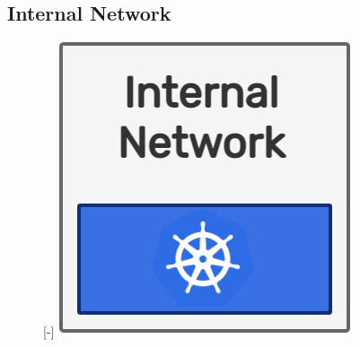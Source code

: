\subsection{Internal Network}
\label{subsec:architecture_network_internal_network}

\begin{figure} %
  \raisebox{0pt}[\dimexpr\height-\baselineskip\relax]{\centering
  \includegraphics[width=.2\textwidth]{images/recluster/internal_network.png}}
\end{figure}

